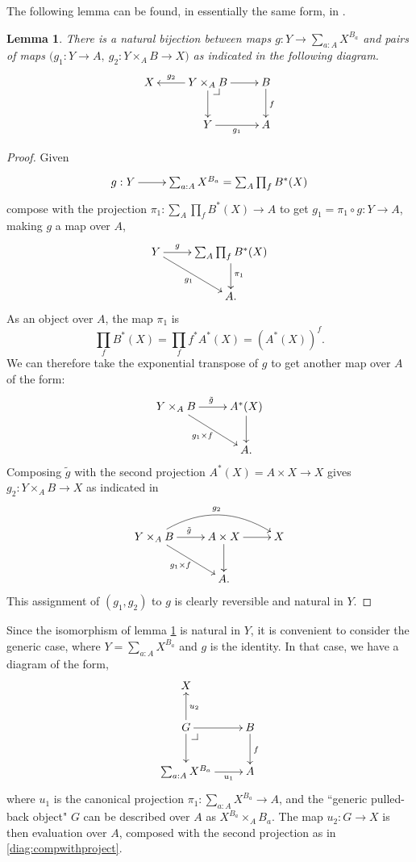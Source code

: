 \documentclass[12pt]{article}
\makeatletter
\newcommand{\pbcorner}[1][dr]{\save*!/#1-1.2pc/#1:(-1,1)@^{|-}\restore}
\newtheorem{lemma}[theorem]{Lemma}
\theoremstyle{definition}
\makeatother
\begin{document}
The following lemma can be found, in essentially the same form, in \cite{DT,PTJ:ppbdht}.
 
\begin{lemma}\label{lem:polyclass}
There is a natural bijection between maps $g : Y \to \sum_{a:A}X^{B_a}$ and pairs of maps $\big(g_1:Y \to A,\ g_2 : Y\times_A B \to X\big)$ as indicated in the following diagram.
%
\begin{equation}\label{diag:polyclass}
\xymatrix{
X & Y\times_A B \ar[l]_-{g_2}  \ar[d]\ar[r]\pbcorner &  B \ar[d]^{f}\\
&Y\ar[r]_{g_1}   & A}
\end{equation}
\end{lemma}
%
\begin{proof}
Given
\[
\xymatrix{
g: Y \ar[r] &  \sum_{a:A}X^{B_a} = \sum_{A}\prod_{f}B^{*}(X)
}
\]
compose with the projection $\pi_1 : \sum_{A}\prod_{f}B^{*}(X)\to A$ to get $g_1 = \pi_1\circ g : Y\to A$, making $g$ a map over $A$,
\[
\xymatrix{
Y \ar[r]^-{g}  \ar[rd]_{g_1}  &  \sum_{A}\prod_{f}B^{*}(X) \ar[d]^{\pi_1}  \\
& A.
}
\]
As an object over $A$, the map $\pi_1$ is
\[
\prod_{f}B^*(X) = \prod_{f}f^*A^*(X) = (A^*(X))^f.
\]
We can therefore take the exponential transpose of $g$ to get another map over $A$ of the form:
\[
\xymatrix{
Y\times_A B \ar[r]^{\tilde{g}}  \ar[rd]_{g_1\times f}  &  A^*(X) \ar[d]  \\
& A.
}
\]
Composing $\tilde{g}$ with the second projection $A^*(X) = A\times X \to X$ gives $g_2 :Y\times_A B \to X$ as indicated in
\begin{equation}\label{diag:compwithproject}
\xymatrix{
Y\times_A B \ar[r]^{\tilde{g}}  \ar[rd]_{g_1\times f} \ar@/{}^{20pt}/[rr]^{g_2} &  A \times X \ar[d] \ar[r] & X \\
& A .
}
\end{equation}
This assignment of $(g_1, g_2)$ to $g$ is clearly reversible and natural in $Y$.
\end{proof}

Since the isomorphism of lemma \ref{lem:polyclass} is natural in $Y$, it is convenient to consider the generic case, where $Y = \sum_{a:A}X^{B_a}$ and $g$ is the identity.  In that case, we have a diagram of the form,
\[
\xymatrix{
X & \\
G \ar[u]_{u_2} \ar[d] \ar[r] \pbcorner &  B \ar[d]^{f}\\
\sum_{a:A}X^{B_a} \ar[r]_-{u_1}   & A
}
\]
where $u_1$ is the canonical projection $\pi_1 : \sum_{a:A}X^{B_a} \to A$, and the ``generic pulled-back object" $G$ can be described over $A$ as
$X^{B_a} \times_A B_a$.
The map $u_2 : G \to X$ is then evaluation over $A$, composed with the second projection as in \eqref{diag:compwithproject}.
\end{document}
